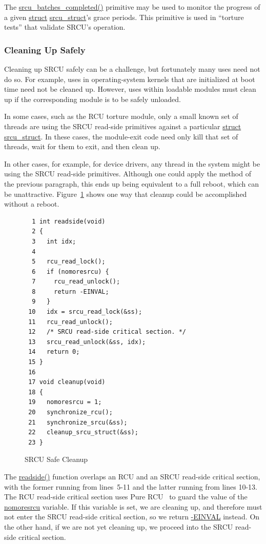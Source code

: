 The \url{srcu_batches_completed()} primitive may be used to
monitor the progress of a given \url{struct} \url{srcu_struct}'s
grace periods.
This primitive is used in ``torture tests'' that validate SRCU's operation.

\subsubsection{Cleaning Up Safely}
\label{sec:app:rcuimpl:Cleaning Up Safely}

Cleaning up SRCU safely can be a challenge, but fortunately many
uses need not do so.
For example, uses in operating-system kernels that are initialized at
boot time need not be cleaned up.
However, uses within loadable modules must clean up if the corresponding
module is to be safely unloaded.

In some cases, such as the RCU torture module,
only a small known set of threads are using the
SRCU read-side primitives against a particular \url{struct} \url{srcu_struct}.
In these cases, the module-exit code need only kill that set of threads,
wait for them to exit, and then clean up.

In other cases, for example, for device drivers, any thread in the
system might be using the SRCU read-side primitives.
Although one could apply the method of the previous paragraph, this
ends up being equivalent to a full reboot, which can be unattractive.
Figure~\ref{fig:app:rcuimpl:SRCU Safe Cleanup} shows one way that cleanup
could be accomplished without a reboot.

\begin{figure}[htbp]
{ \scriptsize
\begin{verbatim}
  1 int readside(void)
  2 {
  3   int idx;
  4 
  5   rcu_read_lock();
  6   if (nomoresrcu) {
  7     rcu_read_unlock();
  8     return -EINVAL;
  9   }
 10   idx = srcu_read_lock(&ss);
 11   rcu_read_unlock();
 12   /* SRCU read-side critical section. */
 13   srcu_read_unlock(&ss, idx);
 14   return 0;
 15 }
 16 
 17 void cleanup(void)
 18 {
 19   nomoresrcu = 1;
 20   synchronize_rcu();
 21   synchronize_srcu(&ss);
 22   cleanup_srcu_struct(&ss);
 23 }
\end{verbatim}
}
\caption{SRCU Safe Cleanup}
\label{fig:app:rcuimpl:SRCU Safe Cleanup}
\end{figure}

The \url{readside()} function overlaps an RCU and an SRCU read-side
critical section, with the former running from lines~5-11 and the
latter running from lines 10-13.
The RCU read-side critical section uses Pure
RCU~\cite{PaulEdwardMcKenneyPhD}
to guard the
value of the \url{nomoresrcu} variable.
If this variable is set, we are cleaning up, and therefore must not enter
the SRCU read-side critical section, so we return \url{-EINVAL} instead.
On the other hand, if we are not yet cleaning up, we proceed into the
SRCU read-side critical section.

